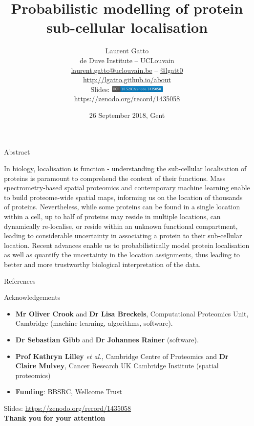 \documentclass[presentation]{beamer}
\date{26 September 2018, Gent}
\title{
  \textbf{Probabilistic modelling of protein sub-cellular localisation}
}
\author{Laurent Gatto\\
  de Duve Institute -- UCLouvain\\
  \url{laurent.gatto@uclouvain.be} -- \url{@lgatt0}\\
  \url{http://lgatto.github.io/about}\\
  \bigskip
  Slides:  \includegraphics[height=3mm]{./figs_local/zenodo1435058.png}\\ \url{https://zenodo.org/record/1435058}
}
\begin{document}
\maketitle


\begin{frame}{Abstract}

\justifying In biology, localisation is function - understanding the
sub-cellular localisation of proteins is paramount to comprehend the
context of their functions. Mass spectrometry-based spatial proteomics
and contemporary machine learning enable to build proteome-wide
spatial maps, informing us on the location of thousands of
proteins. Nevertheless, while some proteins can be found in a single
location within a cell, up to half of proteins may reside in multiple
locations, can dynamically re-localise, or reside within an unknown
functional compartment, leading to considerable uncertainty in
associating a protein to their sub-cellular location. Recent advances
enable us to probabilistically model protein localisation as well as
quantify the uncertainty in the location assignments, thus leading to
better and more trustworthy biological interpretation of the data.


\end{frame}







\begin{frame}[allowframebreaks]{References}
  \tiny
  
  
\end{frame}


\begin{frame}
  \begin{block}{Acknowledgements}
    \begin{itemize}
    \item \textbf{Mr Oliver Crook} and \textbf{Dr Lisa Breckels},
      Computational Proteomics Unit, Cambridge (machine learning,
      algorithms, software).
    \item \textbf{Dr Sebastian Gibb} and \textbf{Dr Johannes Rainer}
      (software).
    \item \textbf{Prof Kathryn Lilley} \textit{et al.}, Cambridge
      Centre of Proteomics and \textbf{Dr Claire Mulvey}, Cancer
      Research UK Cambridge Institute (spatial proteomics)
    \item \textbf{Funding}: BBSRC, Wellcome Trust
    \end{itemize}
  \end{block}



  \begin{center}
    Slides: \url{https://zenodo.org/record/1435058} \\

    \bigskip
    \textbf{Thank you for your attention}
  \end{center}

\end{frame}
\end{document}
